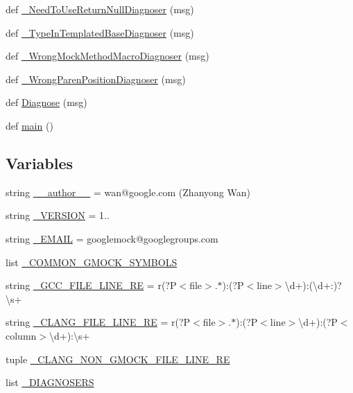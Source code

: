 \begin{DoxyCompactItemize}
def \mbox{\hyperlink{namespacegmock__doctor_af4268f4fc3c0e612231b6a5d53e9e578}{\+\_\+\+Need\+To\+Use\+Return\+Null\+Diagnoser}} (msg)
\item 
def \mbox{\hyperlink{namespacegmock__doctor_ac4e4908d4e43ef87f522365e99ec36c8}{\+\_\+\+Type\+In\+Templated\+Base\+Diagnoser}} (msg)
\item 
def \mbox{\hyperlink{namespacegmock__doctor_a430611c0e038abaa33ae320b7118779b}{\+\_\+\+Wrong\+Mock\+Method\+Macro\+Diagnoser}} (msg)
\item 
def \mbox{\hyperlink{namespacegmock__doctor_a89b0bfee48942a164f7a4e1e923f3a48}{\+\_\+\+Wrong\+Paren\+Position\+Diagnoser}} (msg)
\item 
def \mbox{\hyperlink{namespacegmock__doctor_a8b791ed6679a0135862ebb3e8c27b2b4}{Diagnose}} (msg)
\item 
def \mbox{\hyperlink{namespacegmock__doctor_a6eb6c47cf5a3a7c4266f473c0af6b82f}{main}} ()
\end{DoxyCompactItemize}
\subsection*{Variables}
\begin{DoxyCompactItemize}
\item 
string \mbox{\hyperlink{namespacegmock__doctor_a5834be312e84670506af7df4a7b6bf51}{\+\_\+\+\_\+author\+\_\+\+\_\+}} = \textquotesingle{}wan@google.\+com (Zhanyong Wan)\textquotesingle{}
\item 
string \mbox{\hyperlink{namespacegmock__doctor_a8f29d54c7339c9ac86409b5e78f63887}{\+\_\+\+V\+E\+R\+S\+I\+ON}} = \textquotesingle{}1..\textquotesingle{}
\item 
string \mbox{\hyperlink{namespacegmock__doctor_af8532f014caa9251e48f07e08d92f855}{\+\_\+\+E\+M\+A\+IL}} = \textquotesingle{}googlemock@googlegroups.\+com\textquotesingle{}
\item 
list \mbox{\hyperlink{namespacegmock__doctor_ac704a49399e603fba5104e490f17fce3}{\+\_\+\+C\+O\+M\+M\+O\+N\+\_\+\+G\+M\+O\+C\+K\+\_\+\+S\+Y\+M\+B\+O\+LS}}
\item 
string \mbox{\hyperlink{namespacegmock__doctor_abfa92b554c13bc7b3f37bd53a52288b4}{\+\_\+\+G\+C\+C\+\_\+\+F\+I\+L\+E\+\_\+\+L\+I\+N\+E\+\_\+\+RE}} = r\textquotesingle{}(?P$<$file$>$.$\ast$)\+:(?P$<$line$>$\textbackslash{}d+)\+:(\textbackslash{}d+\+:)?\textbackslash{}s+\textquotesingle{}
\item 
string \mbox{\hyperlink{namespacegmock__doctor_a068279bf4a0afdf3f2106351892a8c42}{\+\_\+\+C\+L\+A\+N\+G\+\_\+\+F\+I\+L\+E\+\_\+\+L\+I\+N\+E\+\_\+\+RE}} = r\textquotesingle{}(?P$<$file$>$.$\ast$)\+:(?P$<$line$>$\textbackslash{}d+)\+:(?P$<$column$>$\textbackslash{}d+)\+:\textbackslash{}s+\textquotesingle{}
\item 
tuple \mbox{\hyperlink{namespacegmock__doctor_a54b24983d4a31b34337e0ef6fdf4fe91}{\+\_\+\+C\+L\+A\+N\+G\+\_\+\+N\+O\+N\+\_\+\+G\+M\+O\+C\+K\+\_\+\+F\+I\+L\+E\+\_\+\+L\+I\+N\+E\+\_\+\+RE}}
\item 
list \mbox{\hyperlink{namespacegmock__doctor_ad8d4f979dbf1b3c8edb226d124571b4e}{\+\_\+\+D\+I\+A\+G\+N\+O\+S\+E\+RS}}
\end{DoxyCompactItemize}


